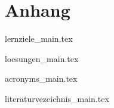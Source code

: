 
\part{Anhang}

{lernziele_main.tex}

{loesungen_main.tex}

{acronyms_main.tex}

{literaturvezeichnis_main.tex}